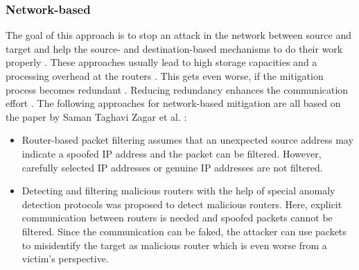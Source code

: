 \subsubsection*{Network-based}
The goal of this approach is to stop an attack in the network between source and target and help the source- and destination-based mechanisms to do their work properly \cite{DDoS-MitigationSurvey}. These approaches usually lead to high storage capacities and a processing overhead at the routers \cite{DDoS-MitigationSurvey}. This gets even worse, if the mitigation process becomes redundant \cite{DDoS-MitigationSurvey}. Reducing redundancy enhances the communication effort \cite{DDoS-MitigationSurvey}. The following approaches for network-based mitigation are all based on the paper by Saman Taghavi Zagar et al. \cite{DDoS-MitigationSurvey}:
    \begin{itemize}
        \item Router-based packet filtering assumes that an unexpected source address may indicate a spoofed IP address and the packet can be filtered. However, carefully selected IP addresses or genuine IP addresses are not filtered. 
        \item Detecting and filtering malicious routers with the help of special anomaly detection protocols was proposed to detect malicious routers. Here, explicit communication between routers is needed and spoofed packets cannot be filtered. Since the communication can be faked, the attacker can use packets to misidentify the target as malicious router which is even worse from a victim's perspective.  
    \end{itemize}
    
